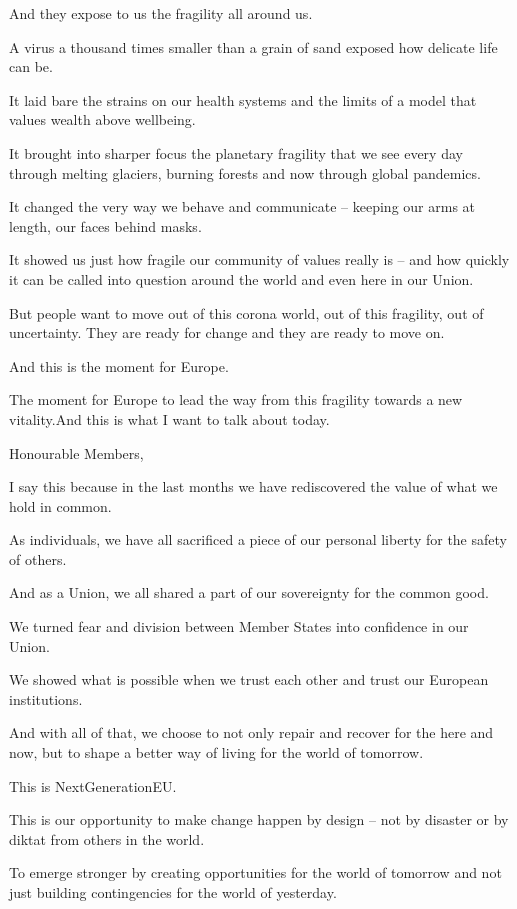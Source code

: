 \documentclass[a4paper,11pt]{article}
\begin{document}
And they expose to us the fragility all around us.

A virus a thousand times smaller than a grain of sand exposed how delicate life can be.

It laid bare the strains on our health systems and the limits of a model that values wealth above wellbeing.

It brought into sharper focus the planetary fragility that we see every day through melting glaciers, burning forests and now through global pandemics.

It changed the very way we behave and communicate – keeping our arms at length, our faces behind masks.

It showed us just how fragile our community of values really is – and how quickly it can be called into question around the world and even here in our Union.

But people want to move out of this corona world, out of this fragility, out of uncertainty.  They are ready for change and they are ready to move on.

And this is the moment for Europe.

The moment for Europe to lead the way from this fragility towards a new vitality.And this is what I want to talk about today.

 

Honourable Members,

I say this because in the last months we have rediscovered the value of what we hold in common.

As individuals, we have all sacrificed a piece of our personal liberty for the safety of others.

And as a Union, we all shared a part of our sovereignty for the common good.

We turned fear and division between Member States into confidence in our Union.

We showed what is possible when we trust each other and trust our European institutions.

And with all of that, we choose to not only repair and recover for the here and now, but to shape a better way of living for the world of tomorrow.

This is NextGenerationEU. 

This is our opportunity to make change happen by design – not by disaster or by diktat from others in the world.

To emerge stronger by creating opportunities for the world of tomorrow and not just building contingencies for the world of yesterday.
\end{document}
